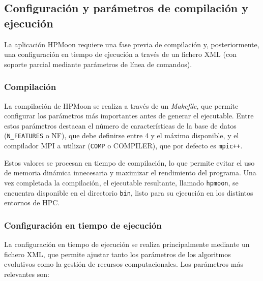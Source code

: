\subsection{Configuración y parámetros de compilación y ejecución}\label{subsec:hpm_configuracion}

La aplicación HPMoon requiere una fase previa de compilación y, posteriormente, una configuración en tiempo de ejecución a través de un fichero XML (con soporte parcial mediante parámetros de línea de comandos).

\subsubsection{Compilación}

La compilación de HPMoon se realiza a través de un \textit{Makefile}, que permite configurar los parámetros más importantes antes de generar el ejecutable. Entre estos parámetros destacan el número de características de la base de datos (\texttt{N\_FEATURES} o NF), que debe definirse entre 4 y el máximo disponible, y el compilador MPI a utilizar (\texttt{COMP} o COMPILER), que por defecto es \texttt{mpic++}.

Estos valores se procesan en tiempo de compilación, lo que permite evitar el uso de memoria dinámica innecesaria y maximizar el rendimiento del programa. Una vez completada la compilación, el ejecutable resultante, llamado \texttt{hpmoon}, se encuentra disponible en el directorio \texttt{bin}, listo para su ejecución en los distintos entornos de HPC.

\subsubsection{Configuración en tiempo de ejecución}

La configuración en tiempo de ejecución se realiza principalmente mediante un fichero XML, que permite ajustar tanto los parámetros de los algoritmos evolutivos como la gestión de recursos computacionales. Los parámetros más relevantes son:

